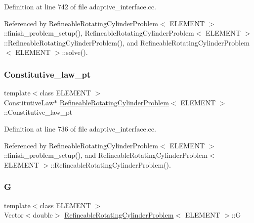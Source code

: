 Definition at line 742 of file adaptive\+\_\+interface.\+cc.



Referenced by Refineable\+Rotating\+Cylinder\+Problem$<$ E\+L\+E\+M\+E\+N\+T $>$\+::finish\+\_\+problem\+\_\+setup(), Refineable\+Rotating\+Cylinder\+Problem$<$ E\+L\+E\+M\+E\+N\+T $>$\+::\+Refineable\+Rotating\+Cylinder\+Problem(), and Refineable\+Rotating\+Cylinder\+Problem$<$ E\+L\+E\+M\+E\+N\+T $>$\+::solve().

\mbox{\label{classRefineableRotatingCylinderProblem_a4e832fa2d6e1faafd39425d132d732e2}} 
\subsubsection{\texorpdfstring{Constitutive\+\_\+law\+\_\+pt}{Constitutive\_law\_pt}}
{\footnotesize\ttfamily template$<$class E\+L\+E\+M\+E\+NT $>$ \\
Constitutive\+Law$\ast$ \hyperlink{classRefineableRotatingCylinderProblem}{Refineable\+Rotating\+Cylinder\+Problem}$<$ E\+L\+E\+M\+E\+NT $>$\+::Constitutive\+\_\+law\+\_\+pt\hspace{0.3cm}{\ttfamily [private]}}



Definition at line 736 of file adaptive\+\_\+interface.\+cc.



Referenced by Refineable\+Rotating\+Cylinder\+Problem$<$ E\+L\+E\+M\+E\+N\+T $>$\+::finish\+\_\+problem\+\_\+setup(), and Refineable\+Rotating\+Cylinder\+Problem$<$ E\+L\+E\+M\+E\+N\+T $>$\+::\+Refineable\+Rotating\+Cylinder\+Problem().

\mbox{\label{classRefineableRotatingCylinderProblem_a270f2243978a54c8d787cc912168bb90}} 
\subsubsection{\texorpdfstring{G}{G}}
{\footnotesize\ttfamily template$<$class E\+L\+E\+M\+E\+NT $>$ \\
Vector$<$double$>$ \hyperlink{classRefineableRotatingCylinderProblem}{Refineable\+Rotating\+Cylinder\+Problem}$<$ E\+L\+E\+M\+E\+NT $>$\+::G}



